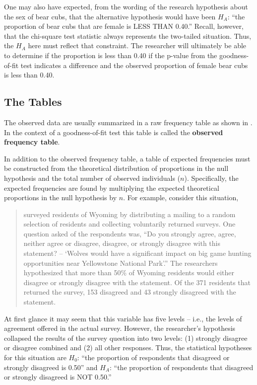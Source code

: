 \documentclass[10pt,openany]{book}\usepackage[]{graphicx}\usepackage[]{color}
\begin{document}
One may also have expected, from the wording of the research hypothesis about the sex of bear cubs, that the alternative hypothesis would have been $H_{A}$: ``the proportion of bear cubs that are female is LESS THAN 0.40.''  Recall, however, that the chi-square test statistic always represents the two-tailed situation.  Thus, the $H_{A}$ here must reflect that constraint.  The researcher will ultimately be able to determine if the proportion is less than 0.40 if the p-value from the goodness-of-fit test indicates a difference and the observed proportion of female bear cubs is less than 0.40.

\subsection{The Tables}
The observed data are usually summarized in a raw frequency table as shown in .  In the context of a goodness-of-fit test this table is called the \textbf{observed frequency table}.

In addition to the observed frequency table, a table of expected frequencies must be constructed from the theoretical distribution of proportions in the null hypothesis and the total number of observed individuals ($n$).  Specifically, the expected frequencies are found by multiplying the expected theoretical proportions in the null hypothesis by $n$.  For example, consider this situation,

\begin{quote}
\cite{BathBuchanan1989} surveyed residents of Wyoming by distributing a mailing to a random selection of residents and collecting voluntarily returned surveys.  One question asked of the respondents was, ``Do you strongly agree, agree, neither agree or disagree, disagree, or strongly disagree with this statement? -- `Wolves would have a significant impact on big game hunting opportunities near Yellowstone National Park'.''  The researchers hypothesized that more than 50\% of Wyoming residents would either disagree or strongly disagree with the statement.  Of the 371 residents that returned the survey, 153 disagreed and 43 strongly disagreed with the statement.
\end{quote}

At first glance it may seem that this variable has five levels -- i.e., the levels of agreement offered in the actual survey.  However, the researcher's hypothesis collapsed the results of the survey question into two levels: (1) strongly disagree or disagree combined and (2) all other responses.  Thus, the statistical hypotheses for this situation are $H_{0}$: ``the proportion of respondents that disagreed or strongly disagreed is 0.50'' and $H_{A}$: ``the proportion of respondents that disagreed or strongly disagreed is NOT 0.50.''
\end{document}
